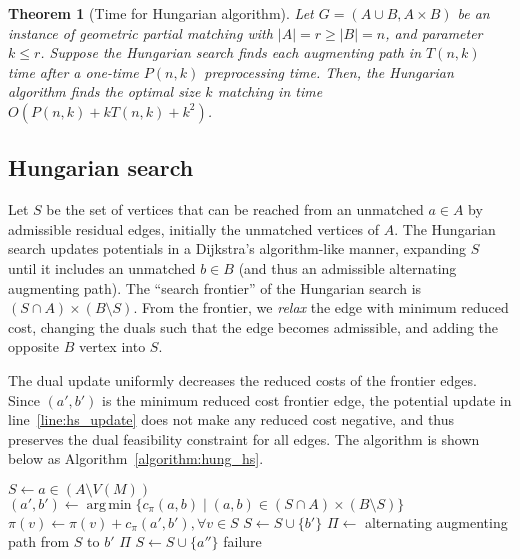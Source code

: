 \documentclass[11pt]{article}
\makeatletter
\DeclareMathOperator*{\argmin}{arg\,min}
\theoremstyle{plain}
\newtheorem{theorem}{Theorem}
\def\n@te#1{\textsf{\boldmath \textbf{$\langle\!\langle$#1$\rangle\!\rangle$}}\leavevmode}
\def\note#1{\textcolor{red}{\n@te{#1}}}
\makeatother
\begin{document}
\begin{theorem}[Time for Hungarian algorithm]
\label{theorem:hung_orig}
Let $G = (A \cup B, A \times B)$ be an instance of geometric partial matching
with $|A| = r \geq |B| = n$, and parameter $k \leq r$.
Suppose the Hungarian search finds each augmenting path in $T(n, k)$ time after
a one-time $P(n, k)$ preprocessing time.
Then, the Hungarian algorithm finds the optimal size $k$ matching in time
$O(P(n, k) + k T(n, k) + k^2)$.
\end{theorem}

\subsection{Hungarian search}

Let $S$ be the set of vertices that can be reached from an unmatched $a \in A$
by admissible residual edges, initially the unmatched vertices of $A$.
The Hungarian search updates potentials in a Dijkstra's algorithm-like manner,
expanding $S$ until it includes an unmatched $b \in B$ (and thus an admissible
alternating augmenting path).
The ``search frontier'' of the Hungarian search is
$(S \cap A) \times (B \setminus S)$.
From the frontier, we \emph{relax} the edge with minimum reduced cost, changing
the duals such that the edge becomes admissible, and adding the opposite $B$
vertex into $S$.

The dual update uniformly decreases the reduced costs of the frontier edges.
Since $(a', b')$ is the minimum reduced cost frontier edge, the potential
update in line~\ref{line:hs_update} does not make any reduced cost negative,
and thus preserves the dual feasibility constraint for all edges.
The algorithm is shown below as Algorithm~\ref{algorithm:hung_hs}.

\begin{figure*}
\centering
\begin{minipage}{.8\linewidth}
\begin{algorithm}[H]
\caption{Hungarian Search (matching)}
\label{algorithm:hung_hs}
\begin{algorithmic}[1]
	\State $S \gets a \in (A \setminus V(M))$
	\Repeat
		\State $(a', b') \gets \argmin\{c_\pi(a, b) \mid (a, b) \in (S \cap A) \times (B \setminus S)\}$
		\State $\pi(v) \gets \pi(v) + c_\pi(a', b'), \forall v \in S$
			\label{line:hs_update}
		\State $S \gets S \cup \{b'\}$
		 
			\State $\Pi \gets$ alternating augmenting path from $S$ to $b'$
			\State\Return $\Pi$
		\Else {}
			\State $S \gets S \cup \{a''\}$
		\EndIf
	\State\Return failure
\EndFunction
\end{algorithmic}
\end{algorithm}
\end{minipage}
\end{figure*}
\end{document}
